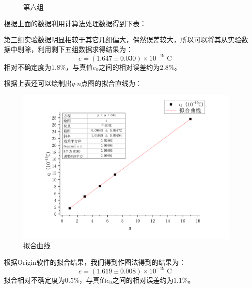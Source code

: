 \documentclass{WHUReport}
\begin{document}
\begin{multicols}{2}
\begin{figure}[H]
		\caption{第六组}
	\end{figure}
	根据上面的数据利用计算法处理数据得到下表：
	\begin{table}[H]
		\centering
		\caption{实验数据表}
	\end{table}
	第三组实验数据明显相较于其它几组偏大，偶然误差较大，所以可以将其从实验数据中剔除，利用剩下五组数据求得结果为：
	\begin{equation}
		e = (1.647\pm0.030 )\times 10^{-19}\operatorname{C}
	\end{equation}
	相对不确定度为$1.8\%$，与真值$e_0$之间的相对误差约为$2.8\%$。
	
	根据上表还可以绘制出$q\mbox{-}n$点图的拟合直线为：
	\begin{figure}[H]
		\centering
		\includegraphics[width=\linewidth]{figs/fit.pdf}
		\caption{拟合曲线}
	\end{figure}
	根据Origin软件的拟合结果，我们得到作图法得到的结果为：
	\begin{equation}
		e = (1.619\pm0.008 )\times 10^{-19}\operatorname{C}
	\end{equation}
	拟合相对不确定度为$0.5\%$，与真值$e_0$之间的相对误差约为$1.1\%$。
	

\end{multicols}
\end{document}
